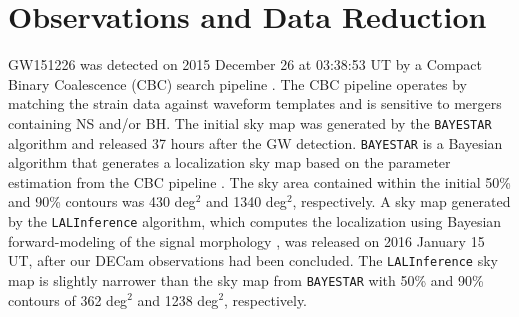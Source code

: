 \section{Observations and Data Reduction} 
\label{sec:obs}
   
GW151226 was detected on 2015 December 26 at 03:38:53 UT by a 
Compact Binary Coalescence (CBC) search pipeline \citep{abb+16c}. The CBC
pipeline operates by matching the strain data against waveform
templates and is sensitive to mergers containing NS and/or BH. 
The initial sky map was generated by the {\tt BAYESTAR} algorithm
and released 37 hours after the GW detection. {\tt BAYESTAR} is a Bayesian 
algorithm that generates a localization sky map based on the parameter
estimation from the CBC pipeline \citep{sing+14,sing+16}. The sky area contained within the
initial 50\% and 90\% contours was 430 deg$^2$ and 1340 deg$^2$,
respectively. A sky map generated by the {\tt LALInference}
algorithm, which computes the localization using Bayesian forward-modeling 
of the signal morphology \citep{veitch+15}, was released on 2016 January 15 UT, 
after our DECam observations had been concluded. The {\tt LALInference} sky map
is slightly narrower than the sky map from {\tt BAYESTAR} with 50\% and 90\% contours 
of 362 deg$^2$ and 1238 deg$^2$, respectively.

